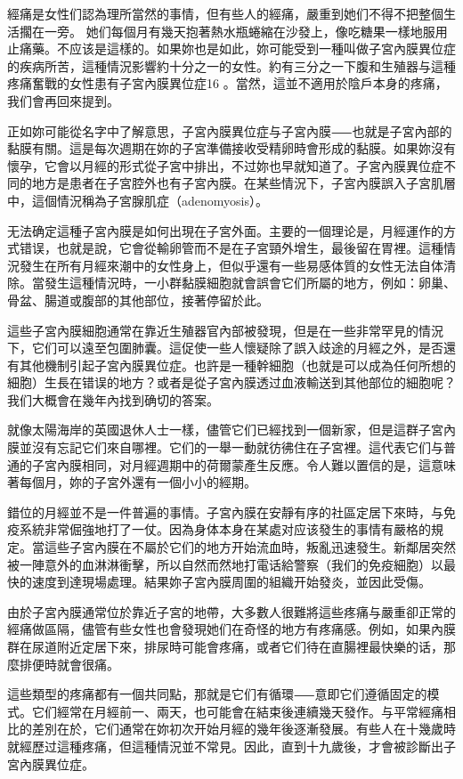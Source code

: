 \documentclass[12pt,UTF8]{ctexbook}
\begin{document}
經痛是女性们認為理所當然的事情，但有些人的經痛，嚴重到她们不得不把整個生活擱在一旁。 她们每個月有幾天抱著熱水瓶蜷縮在沙發上，像吃糖果一樣地服用止痛藥。不应该是這樣的。如果妳也是如此，妳可能受到一種叫做子宮內膜異位症的疾病所苦，這種情況影響約十分之一的女性。約有三分之一下腹和生殖器与這種疼痛奮戰的女性患有子宮內膜異位症16 。當然，這並不適用於陰戶本身的疼痛，我们會再回來提到。

正如妳可能從名字中了解意思，子宮內膜異位症与子宮內膜⸺也就是子宮內部的黏膜有關。這是每次週期在妳的子宮準備接收受精卵時會形成的黏膜。如果妳沒有懷孕，它會以月經的形式從子宮中排出，不过妳也早就知道了。子宮內膜異位症不同的地方是患者在子宮腔外也有子宮內膜。在某些情況下，子宮內膜誤入子宮肌層中，這個情況稱為子宮腺肌症（adenomyosis）。

无法确定這種子宮內膜是如何出現在子宮外面。主要的一個理论是，月經運作的方式错误，也就是說，它會從輸卵管而不是在子宮頸外增生，最後留在胃裡。這種情況發生在所有月經來潮中的女性身上，但似乎還有一些易感体質的女性无法自体清除。當發生這種情況時，一小群黏膜細胞就會誤會它们所屬的地方，例如：卵巢、骨盆、腸道或腹部的其他部位，接著停留於此。

這些子宮內膜細胞通常在靠近生殖器官內部被發現，但是在一些非常罕見的情況下，它们可以遠至包圍肺囊。這促使一些人懷疑除了誤入歧途的月經之外，是否還有其他機制引起子宮內膜異位症。也許是一種幹細胞（也就是可以成為任何所想的細胞）生長在错误的地方？或者是從子宮內膜透过血液輸送到其他部位的細胞呢？我们大概會在幾年內找到确切的答案。

就像太陽海岸的英國退休人士一樣，儘管它们已經找到一個新家，但是這群子宮內膜並沒有忘記它们來自哪裡。它们的一舉一動就彷彿住在子宮裡。這代表它们与普通的子宮內膜相同，对月經週期中的荷爾蒙產生反應。令人難以置信的是，這意味著每個月，妳的子宮外還有一個小小的經期。

錯位的月經並不是一件普遍的事情。子宮內膜在安靜有序的社區定居下來時，与免疫系統非常倔強地打了一仗。因為身体本身在某處对应该發生的事情有嚴格的規定。當這些子宮內膜在不屬於它们的地方开始流血時，叛亂迅速發生。新鄰居突然被一陣意外的血淋淋衝擊，所以自然而然地打電话給警察（我们的免疫細胞）以最快的速度到達現場處理。結果妳子宮內膜周圍的組織开始發炎，並因此受傷。





由於子宮內膜通常位於靠近子宮的地帶，大多數人很難將這些疼痛与嚴重卻正常的經痛做區隔，儘管有些女性也會發現她们在奇怪的地方有疼痛感。例如，如果內膜群在尿道附近定居下來，排尿時可能會疼痛，或者它们待在直腸裡最快樂的话，那麼排便時就會很痛。

這些類型的疼痛都有一個共同點，那就是它们有循環⸺意即它们遵循固定的模式。它们經常在月經前一、兩天，也可能會在結束後連續幾天發作。与平常經痛相比的差別在於，它们通常在妳初次开始月經的幾年後逐漸發展。有些人在十幾歲時就經歷过這種疼痛，但這種情況並不常見。因此，直到十九歲後，才會被診斷出子宮內膜異位症。
\end{document}
